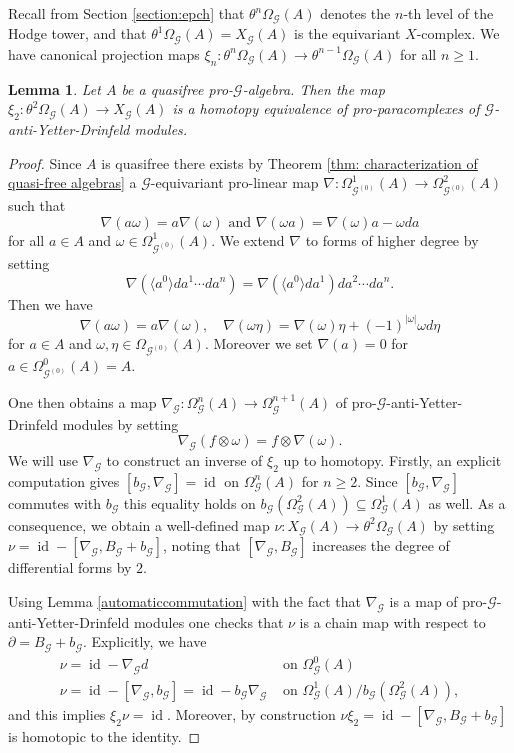 \documentclass{amsart}
\newtheorem{lemma}[thm]{Lemma}
\newcommand{\G}{\mathcal{G}}
\DeclareMathOperator{\id}{id}
\begin{document}
Recall from Section \ref{section:epch} that $ \theta^n \Omega_\G(A) $ denotes the $ n $-th level of the Hodge tower, and that $ \theta^1 \Omega_\G(A) = X_\G(A) $ is the 
equivariant $ X $-complex. We have canonical projection maps $ \xi_n: \theta^n \Omega_\G(A) \rightarrow \theta^{n - 1} \Omega_\G(A) $ for all $ n \geq 1 $. 

\begin{lemma} \label{lemma: homotopy equivalence between theta^2 and X_G}
Let $ A $ be a quasifree pro-$ \G $-algebra. Then the map $ \xi_2: \theta^2 \Omega_\G(A) \rightarrow X_\G(A) $ is a homotopy equivalence of pro-paracomplexes of $ \G $-anti-Yetter-Drinfeld modules.
\end{lemma}

\begin{proof}
Since $A$ is quasifree there exists by Theorem \ref{thm: characterization of quasi-free algebras} a $ \G $-equivariant pro-linear 
map $ \nabla: \Omega^1_{\G^{(0)}}(A) \rightarrow \Omega^2_{\G^{(0)}}(A)$ such that
$$
\nabla(a \omega) = a \nabla(\omega) \text{  and  } \nabla(\omega a) = \nabla(\omega) a -\omega da
$$
for all $ a \in A $ and $\omega \in \Omega^1_{\G^{(0)}}(A) $. We extend $ \nabla $ to forms of higher degree by setting 
$$
\nabla\left(\langle a^0 \rangle da^1 \cdots da^n\right)=\nabla\left(\langle a^0 \rangle da^1\right) da^2 \cdots da^n.
$$ 
Then we have
$$
\nabla(a \omega)=a \nabla(\omega), \quad \nabla(\omega \eta)=\nabla(\omega) \eta+(-1)^{|\omega|} \omega d \eta
$$
for $ a \in A $ and $ \omega, \eta \in \Omega_{\G^{(0)}}(A) $. Moreover we set $ \nabla(a) = 0$ for $ a \in \Omega^0_{\G^{(0)}}(A) = A $.

One then obtains a map $ \nabla_\G: \Omega_\G^n(A) \rightarrow \Omega_\G^{n+1}(A)$ of pro-$ \G $-anti-Yetter-Drinfeld modules by setting 
$$
\nabla_\G(f\otimes \omega)=f\otimes \nabla(\omega).
$$
We will use $ \nabla_\G $ to construct an inverse of $ \xi_2 $ up to homotopy. 
Firstly, an explicit computation gives $ \left[b_\G, \nabla_\G\right] = \id $ on $ \Omega^n_{\G}(A) $ for $ n \geq 2 $. Since $\left[b_\G, \nabla_\G\right]$ commutes 
with $ b_\G $ this equality holds on $ b_\G(\Omega_\G^2(A)) \subseteq \Omega^1_\G(A) $ as well. As a consequence, we obtain a well-defined 
map $ \nu: X_\G(A) \rightarrow \theta^2 \Omega_\G(A) $ by setting $ \nu = \id - [\nabla_\G, B_\G + b_\G] $, noting that $ [\nabla_\G, B_\G] $ increases the degree of 
differential forms by $ 2 $. 

Using Lemma \ref{automaticcommutation} with the fact that $ \nabla_\G $ is a map of pro-$ \G $-anti-Yetter-Drinfeld modules one checks that $ \nu $ is a chain map with 
respect to $ \partial = B_\G + b_\G $. Explicitly, we have 
$$
\begin{array}{ll}
\nu = \id-\nabla_\G d & \text { on } \Omega_\G^0(A) \\
\nu = \id-\left[\nabla_\G, b_\G\right] = \id - b_\G \nabla_\G & \text { on } \Omega_\G^1(A)/b_\G\left(\Omega_\G^2(A)\right),
\end{array}
$$
and this implies $ \xi_2 \nu = \id $. Moreover, by construction 
$ \nu \xi_2 = \id - \left[\nabla_\G, B_\G + b_\G\right]$ is homotopic to the identity.
\end{proof}
\end{document}
